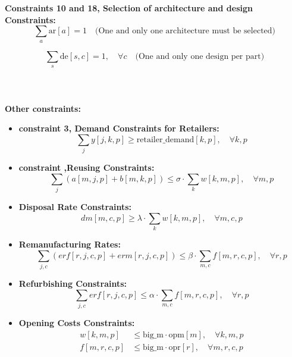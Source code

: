 \documentclass{article}
\begin{document}
    \textbf{Constraints 10 and 18, Selection of architecture and design Constraints:}
    \[
        \sum_a \text{ar}[a] = 1 \quad \text{(One and only one architecture must be selected)}
    \]

    \[
        \sum_s \text{de}[s,c] = 1, \quad \forall c \quad \text{(One and only one design per part)}
    \]
    \\
    \\
    \\








    \textbf{Other constraints:}


    \begin{itemize}
        \item \textbf{constraint 3, Demand Constraints for Retailers:}
        \[
            \sum_{j} y[j,k,p] \geq \text{retailer\_demand}[k,p], \quad \forall k, p
        \]

        \item \textbf{constraint ,Reusing Constraints:}
        \[
            \sum_{j} (a[m,j,p] + b[m,k,p]) \leq \sigma \cdot \sum_{k} w[k,m,p], \quad \forall m, p
        \]

        \item \textbf{Disposal Rate Constraints:}
        \[
            dm[m,c,p] \geq \lambda \cdot \sum_{k} w[k,m,p], \quad \forall m, c, p
        \]

        \item \textbf{Remanufacturing Rates:}
        \[
            \sum_{j,c} (erf[r,j,c,p] + erm[r,j,c,p]) \leq \beta \cdot \sum_{m,c} f[m,r,c,p], \quad \forall r, p
        \]

        \item \textbf{Refurbishing Constraints:}
        \[
            \sum_{j,c} erf[r,j,c,p] \leq \alpha \cdot \sum_{m,c} f[m,r,c,p], \quad \forall r, p
        \]

        \item \textbf{Opening Costs Constraints:}
        \begin{align*}
            w[k,m,p] &\leq \text{big\_m} \cdot \text{opm}[m], \quad \forall k, m, p \\
            f[m,r,c,p] &\leq \text{big\_m} \cdot \text{opr}[r], \quad \forall m, r, c, p
        \end{align*}


\end{itemize}
\end{document}
